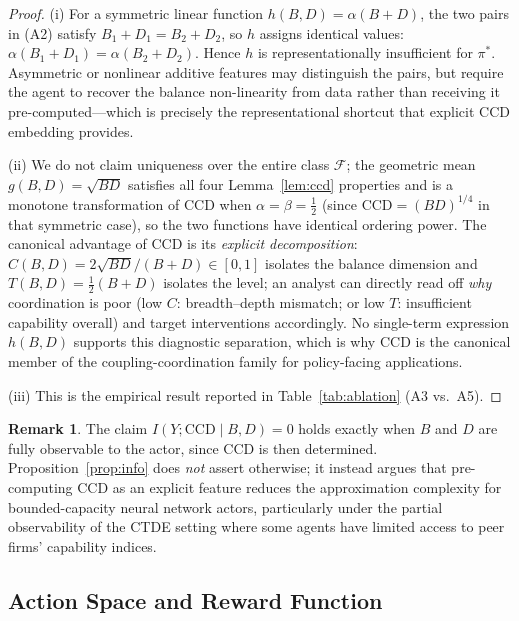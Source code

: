 \documentclass[11pt,a4paper]{article}
\theoremstyle{plain}
\theoremstyle{definition}
\newtheorem{remark}{Remark}
\newcommand{\CCD}{\mathrm{CCD}}
\begin{document}
\begin{proof}
(i) For a symmetric linear function $h(B,D)=\alpha(B+D)$, the two pairs in (A2)
satisfy $B_1+D_1=B_2+D_2$, so $h$ assigns identical values: $\alpha(B_1+D_1)=\alpha(B_2+D_2)$.
Hence $h$ is representationally insufficient for $\pi^*$.  Asymmetric or nonlinear
additive features may distinguish the pairs, but require the agent to recover the
balance non-linearity from data rather than receiving it pre-computed---which is
precisely the representational shortcut that explicit CCD embedding provides.

(ii) We do not claim uniqueness over the entire class $\mathcal{F}$; the geometric mean
$g(B,D)=\sqrt{BD}$ satisfies all four Lemma~\ref{lem:ccd} properties and is a monotone
transformation of $\CCD$ when $\alpha=\beta=\tfrac{1}{2}$ (since $\CCD=(BD)^{1/4}$ in
that symmetric case), so the two functions have identical ordering power.  The canonical
advantage of $\CCD$ is its \emph{explicit decomposition}: $C(B,D)=2\sqrt{BD}/(B+D)\in[0,1]$
isolates the balance dimension and $T(B,D)=\tfrac12(B+D)$ isolates the level; an analyst
can directly read off \emph{why} coordination is poor (low $C$: breadth--depth mismatch;
or low $T$: insufficient capability overall) and target interventions accordingly.  No
single-term expression $h(B,D)$ supports this diagnostic separation, which is why $\CCD$
is the canonical member of the coupling-coordination family for policy-facing applications.

(iii) This is the empirical result reported in Table~\ref{tab:ablation} (A3 vs.\ A5).
\end{proof}

\begin{remark}
The claim $I(Y;\CCD\mid B,D)=0$ holds exactly when $B$ and $D$ are fully observable to
the actor, since CCD is then determined.  Proposition~\ref{prop:info} does \emph{not}
assert otherwise; it instead argues that pre-computing CCD as an explicit feature
reduces the approximation complexity for bounded-capacity neural network actors,
particularly under the partial observability of the CTDE setting where some agents have
limited access to peer firms' capability indices.
\end{remark}

\subsection{Action Space and Reward Function}
\label{sec:reward}
\end{document}
